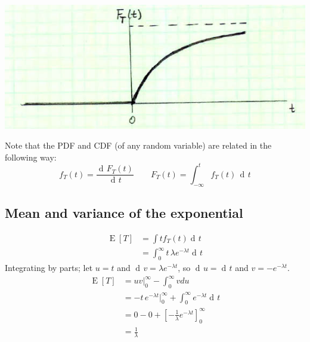 \documentclass[11pt]{article}
\DeclareMathOperator{\dif}{d\!}
\DeclareMathOperator{\E}{E}
\begin{document}
\begin{center}
\includegraphics[scale=0.5]{Figure2.jpg}
\end{center}

\begin{framed}
Note that the PDF and CDF (of any random variable) are related in the following way:
\begin{equation}
f_T(t) = \frac{\dif F_T(t)}{\dif t} \quad \quad F_T(t) = \int^{t}_{-\infty} f_T(t) \, \dif t
\end{equation}
\end{framed}

\subsection{Mean and variance of the exponential}
\begin{equation}
\begin{split}
\E[T] &= \int t f_T(t) \dif t \\
   &= \int_0^{\infty} t \, \lambda e^{-\lambda t} \dif t
\end{split}
\end{equation}
Integrating by parts; let $u=t$ and $\dif v = \lambda e^{-\lambda t}$, 
    so $\dif u= \dif t$ and $v = -e^{-\lambda t}$.
\begin{equation}
\begin{split}
\E[T] &= u v \rvert_0^{\infty} - \int_0^{\infty} v du \\
   &= -t \, e^{-\lambda t} \rvert_0^{\infty} + \int_0^{\infty} e^{-\lambda t} \dif t \\
   &= 0 - 0 + \left[-\frac{1}{\lambda} e^{-\lambda t}\right]_0^{\infty} \\
   &= \frac{1}{\lambda}
\end{split}
\end{equation}
\end{document}
